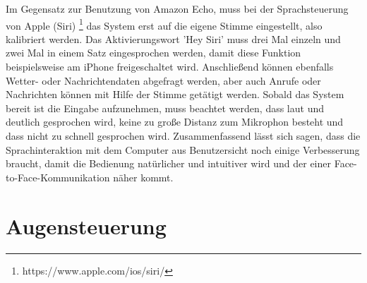 Im Gegensatz zur Benutzung von Amazon Echo, muss bei der Sprachsteuerung von Apple (Siri)%
\footnote{https://www.apple.com/ios/siri/}
%
 das System erst auf die eigene Stimme eingestellt, also kalibriert werden. Das Aktivierungswort 'Hey Siri' muss drei Mal einzeln und zwei Mal in einem Satz eingesprochen werden, damit diese Funktion beispielsweise am iPhone freigeschaltet wird. Anschließend können ebenfalls Wetter- oder Nachrichtendaten abgefragt werden, aber auch Anrufe oder Nachrichten können mit Hilfe der Stimme getätigt werden. 
\newline \newline
Sobald das System bereit ist die Eingabe aufzunehmen, muss beachtet werden, dass laut und deutlich gesprochen wird, keine zu große Distanz zum Mikrophon besteht und dass nicht zu schnell gesprochen wird.
\newline \newline
Zusammenfassend lässt sich sagen, dass die Sprachinteraktion mit dem Computer aus Benutzersicht noch einige Verbesserung braucht, damit die Bedienung natürlicher und intuitiver wird und der einer Face-to-Face-Kommunikation näher kommt.

\section{Augensteuerung}
\label{cha:Augensteuerung}

